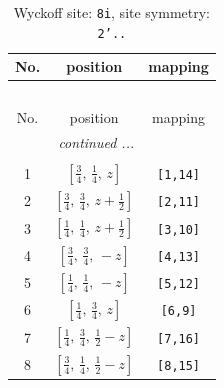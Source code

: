 \documentclass[fleqn,8pt]{jsarticle}
\begin{document}
\begin{longtable}{ccc}
\caption{Wyckoff site: {\tt 8i}, site symmetry: {\tt 2'..}}
 \\
 \hline \hline
No. & position & mapping \\ \hline \endfirsthead

\multicolumn{2}{l}{\tablename\ \thetable{}} \\
 \hline \hline
No. & position & mapping \\ \hline \endhead

 \hline \hline
\multicolumn{2}{r}{\footnotesize\it continued ...} \\ \endfoot

 \hline \hline
\multicolumn{2}{r}{} \\ \endlastfoot

1 & $\left[ \frac{3}{4},\, \frac{1}{4},\, z \right]$ & {\tt [1,14]} \\ \hline
2 & $\left[ \frac{3}{4},\, \frac{3}{4},\, z + \frac{1}{2} \right]$ & {\tt [2,11]} \\ \hline
3 & $\left[ \frac{1}{4},\, \frac{1}{4},\, z + \frac{1}{2} \right]$ & {\tt [3,10]} \\ \hline
4 & $\left[ \frac{3}{4},\, \frac{3}{4},\, - z \right]$ & {\tt [4,13]} \\ \hline
5 & $\left[ \frac{1}{4},\, \frac{1}{4},\, - z \right]$ & {\tt [5,12]} \\ \hline
6 & $\left[ \frac{1}{4},\, \frac{3}{4},\, z \right]$ & {\tt [6,9]} \\ \hline
7 & $\left[ \frac{1}{4},\, \frac{3}{4},\, \frac{1}{2} - z \right]$ & {\tt [7,16]} \\ \hline
8 & $\left[ \frac{3}{4},\, \frac{1}{4},\, \frac{1}{2} - z \right]$ & {\tt [8,15]} \\
\end{longtable}
\renewcommand{\arraystretch}{1.2}
\end{document}
